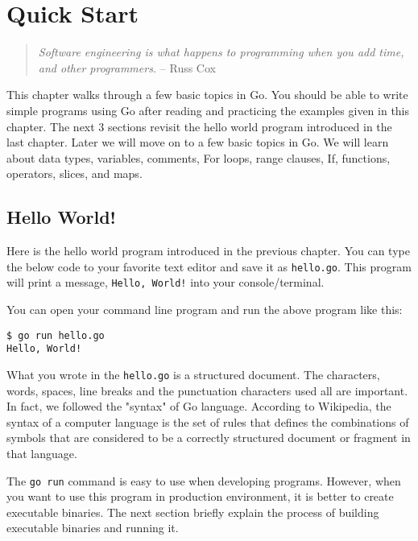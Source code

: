 \cleardoublepage
{}
\chapter{Quick Start}

\begin{quote}
\textit{Software engineering is what happens to programming when you add time,
and other programmers.} -- Russ Cox
\end{quote}

This chapter walks through a few basic topics in Go. You should be able to write
simple programs using Go after reading and practicing the examples given in this
chapter. The next 3 sections revisit the hello world program introduced in the
last chapter. Later we will move on to a few basic topics in Go. We will learn
about data types, variables, comments, For loops, range clauses, If, functions,
operators, slices, and maps.

\section{Hello World!}

Here is the hello world program introduced in the previous chapter.
You can type the below code to your favorite text editor and save it
as \texttt{hello.go}.  This program will print a
message, \texttt{Hello, World!} into your console/terminal.



You can open your command line program and run the above program like
this:

\begin{lstlisting}[numbers=none]
$ go run hello.go
Hello, World!
\end{lstlisting}

What you wrote in the \texttt{hello.go} is a structured document.  The
characters, words, spaces, line breaks and the punctuation characters
used all are important.  In fact, we followed the "syntax" of Go
language.  According to Wikipedia, the syntax of a computer language
is the set of rules that defines the combinations of symbols that are
considered to be a correctly structured document or fragment in that
language.

The \texttt{go run} command is easy to use when developing programs.
However, when you want to use this program in production environment,
it is better to create executable binaries.  The next section briefly
explain the process of building executable binaries and running it.

